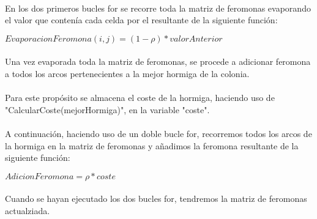 	\paragraph{}En los dos primeros bucles for se recorre toda la matriz de feromonas evaporando el valor que contenía cada celda por el resultante de la siguiente función:
	
	\begin{center}
		$EvaporacionFeromona(i,j) = (1-\rho)*valorAnterior$
	\end{center}

	\paragraph{}Una vez evaporada toda la matriz de feromonas, se procede a adicionar feromona a todos los arcos pertenecientes a la mejor hormiga de la colonia.
	
	\paragraph{}Para este propósito se almacena el coste de la hormiga, haciendo uso de "CalcularCoste(mejorHormiga)", en la variable "coste".
	
	\paragraph{}A continuación, haciendo uso de un doble bucle for, recorremos todos los arcos de la hormiga en la matriz de feromonas y añadimos la feromona resultante de la siguiente función:
	
	\begin{center}
		$AdicionFeromona = \rho*coste$
	\end{center}

	\paragraph{}Cuando se hayan ejecutado los dos bucles for, tendremos la matriz de feromonas actualziada.
	
	\newpage